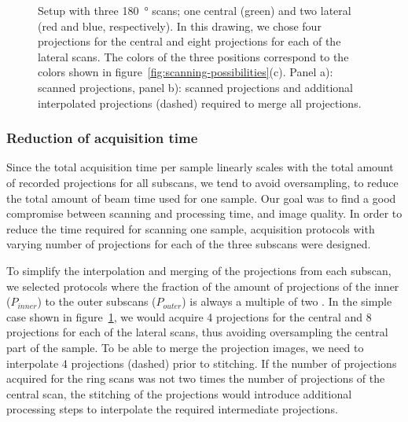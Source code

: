 \ifiucr
	\begin{figure}%
		\caption{Setup with three \SI{180}{\degree} scans; one central (green) and two lateral (red and blue, respectively). In this drawing, we chose four projections for the central and eight projections for each of the lateral scans. The colors of the three positions correspond to the colors shown in figure~\ref{fig:scanning-possibilities}(c). Panel a): scanned projections, panel b): scanned projections and additional interpolated projections (dashed) required to merge all projections.}%
		\label{fig:projections}%
	\end{figure}%
\else
	\begin{figure*}[htp]
		\centering
		\caption{Setup with three \SI{180}{\degree} scans; one central (green) and two lateral (red and blue, respectively). In this drawing, we chose four projections for the central and eight projections for each of the lateral scans. The colors of the three positions correspond to the colors shown in figure~\ref{fig:scanning-possibilities}(c). Panel a): scanned projections, panel b): scanned projections and additional interpolated projections (dashed) required to merge all projections.}%
		\label{fig:projections}
	\end{figure*}
\fi

\subsubsection{Reduction of acquisition time}\label{subsubsec:reduction-of-acquisition-time}%
Since the total acquisition time per sample linearly scales with the total amount of recorded projections for all subscans, we tend to avoid oversampling, to reduce the total amount of beam time used for one sample. Our goal was to find a good compromise between scanning and processing time, and image quality. In order to reduce the time required for scanning one sample, acquisition protocols with varying number of projections for each of the three subscans were designed.

To simplify the interpolation and merging of the projections from each subscan, we selected protocols where the fraction of the amount of projections of the inner ($P_{inner}$) to the outer subscans ($P_{outer}$) is always a multiple of two%
. In the simple case shown in figure~\ref{fig:projections}, we would acquire 4 projections for the central and 8 projections for each of the lateral scans, thus avoiding oversampling the central part of the sample. To be able to merge the projection images, we need to interpolate 4 projections (dashed) prior to stitching. If the number of projections acquired for the ring scans was not two times the number of projections of the central scan, the stitching of the projections would introduce additional processing steps to interpolate the required intermediate projections.


